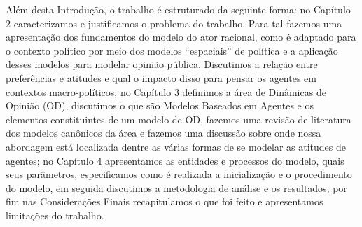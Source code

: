 Além desta Introdução, o trabalho é estruturado da seguinte forma: no Capítulo 2
caracterizamos e justificamos o problema do trabalho. Para tal fazemos uma
apresentação dos fundamentos do modelo do ator racional, como é adaptado para o
contexto político por meio dos modelos ``espaciais'' de política e a aplicação
desses modelos para modelar opinião pública. Discutimos a relação entre
preferências e atitudes e qual o impacto disso para pensar os agentes em
contextos macro-políticos; no Capítulo 3 definimos a área de Dinâmicas de
Opinião (OD), discutimos o que são Modelos Baseados em Agentes e os elementos
constituintes de um modelo de OD, fazemos uma revisão de literatura dos modelos
canônicos da área e fazemos uma discussão sobre onde nossa abordagem está
localizada dentre as várias formas de se modelar as atitudes de agentes; no
Capítulo 4 apresentamos as entidades e processos do modelo, quais seus
parâmetros, especificamos como é realizada a inicialização e o procedimento do
modelo, em seguida discutimos a metodologia de análise e os resultados; por fim
nas Considerações Finais recapitulamos o que foi feito e apresentamos limitações
do trabalho.









